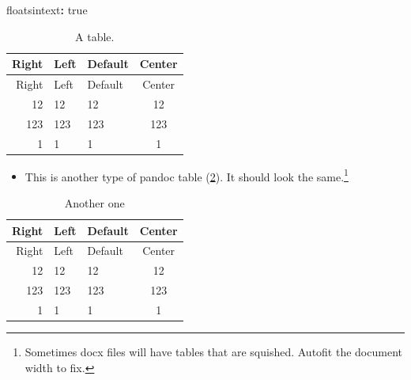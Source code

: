 \documentclass[\pandocDocMode,longtable,noextraspace,floatsintext]{apa6}
\let\tightlist\relax %
\newenvironment{Shaded}{}{}
\newcommand{\AttributeTok}[1]{\textcolor[rgb]{0.49,0.56,0.16}{#1}}
\newcommand{\CharTok}[1]{\textcolor[rgb]{0.25,0.44,0.63}{#1}}
\newcommand{\FunctionTok}[1]{\textcolor[rgb]{0.02,0.16,0.49}{#1}}
\newcommand{\KeywordTok}[1]{\textcolor[rgb]{0.00,0.44,0.13}{\textbf{#1}}}
\begin{document}
\begin{Shaded}
\begin{Highlighting}[]
\FunctionTok{floatsintext}\KeywordTok{:}\AttributeTok{ }\CharTok{true}
\end{Highlighting}
\end{Shaded}

\begin{longtable}[]{@{}rllc@{}}
\caption{A table. \label{tbl:mytable}}\tabularnewline
\toprule
Right & Left & Default & Center\tabularnewline
\midrule
\endfirsthead
\toprule
Right & Left & Default & Center\tabularnewline
\midrule
\endhead
12 & 12 & 12 & 12\tabularnewline
123 & 123 & 123 & 123\tabularnewline
1 & 1 & 1 & 1\tabularnewline
\bottomrule
\end{longtable}

\begin{itemize}
\tightlist
\item
  This is another type of pandoc table (\ref{tbl:anotherone}). It should
  look the same.\footnote{Sometimes docx files will have tables that are
    squished. Autofit the document width to fix.}
\end{itemize}

\begin{longtable}[]{@{}rllc@{}}
\caption{Another one \label{tbl:anotherone}}\tabularnewline
\toprule
Right & Left & Default & Center\tabularnewline
\midrule
\endfirsthead
\toprule
Right & Left & Default & Center\tabularnewline
\midrule
\endhead
12 & 12 & 12 & 12\tabularnewline
123 & 123 & 123 & 123\tabularnewline
1 & 1 & 1 & 1\tabularnewline
\bottomrule
\end{longtable}

\newpage
\end{document}
